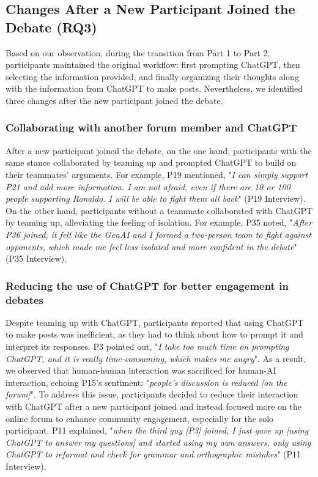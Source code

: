 \subsection{Changes After a New Participant Joined the Debate (RQ3)}

Based on our observation, during the transition from Part 1 to Part 2, participants maintained the original workflow: first prompting ChatGPT, then selecting the information provided, and finally organizing their thoughts along with the information from ChatGPT to make posts. Nevertheless, we identified three changes after the new participant joined the debate.

\subsubsection{Collaborating with another forum member and ChatGPT}

After a new participant joined the debate, on the one hand, participants with the same stance collaborated by teaming up and prompted ChatGPT to build on their teammates' arguments. For example, P19 mentioned, "\textit{I can simply support P21 and add more information. I am not afraid, even if there are 10 or 100 people supporting Ronaldo. I will be able to fight them all back}" (P19 Interview). On the other hand, participants without a teammate collaborated with ChatGPT by teaming up, alleviating the feeling of isolation. For example, P35 noted, "\textit{After P36 joined, it felt like the GenAI and I formed a two-person team to fight against opponents, which made me feel less isolated and more confident in the debate}" (P35 Interview).

\subsubsection{Reducing the use of ChatGPT for better engagement in debates}
Despite teaming up with ChatGPT, participants reported that using ChatGPT to make posts was inefficient, as they had to think about how to prompt it and interpret its responses. P3 pointed out, "\textit{I take too much time on prompting ChatGPT, and it is really time-consuming, which makes me angry}". As a result, we observed that human-human interaction was sacrificed for human-AI interaction, echoing P15's sentiment: "\textit{people's discussion is reduced [on the forum]}". To address this issue, participants decided to reduce their interaction with ChatGPT after a new participant joined and instead focused more on the online forum to enhance community engagement, especially for the solo participant. P11 explained, "\textit{when the third guy [P3] joined, I just gave up [using ChatGPT to answer my questions] and started using my own answers, only using ChatGPT to reformat and check for grammar and orthographic mistakes}" (P11 Interview).

